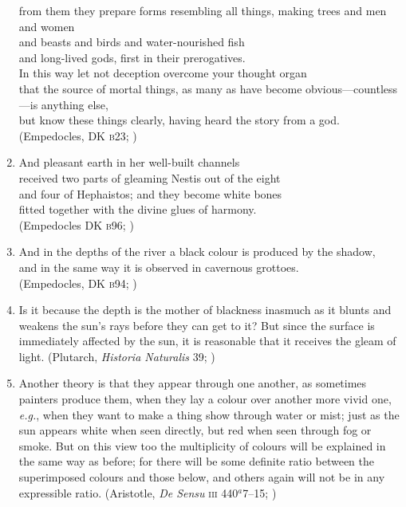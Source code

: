 \documentclass[10pt]{article}
\begin{document}
\begin{enumerate}
    from them they prepare forms resembling all things,
    making trees and men and women\\
    and beasts and birds and water-nourished fish\\
    and long-lived gods, first in their prerogatives.\\
    In this way let not deception overcome your thought organ\\
    that the source of mortal things, as many as have become obvious---countless---is anything else,\\
    but know these things clearly, having heard the story from a god.\\ 
    (Empedocles, DK \textsc{b}23; \citealt[27 231]{Inwood:2001ve})
    \item And pleasant earth in her well-built channels\\
    received two parts of gleaming Nestis out of the eight\\
    and four of Hephaistos; and they become white bones\\
    fitted together with the divine glues of harmony.\\
    (Empedocles DK \textsc{b}96; \citealt[62 245]{Inwood:2001ve})
    \item And in the depths of the river a black colour is produced by the shadow,\\
    and in the same way it is observed in cavernous grottoes.\\
    (Empedocles, DK \textsc{b}94; \citealt[105 261]{Inwood:2001ve})
    \item Is it because the depth is the mother of blackness inasmuch as it blunts and weakens the sun's rays before they can get to it? But since the surface is immediately affected by the sun, it is reasonable that it receives the gleam of light.  (Plutarch, \emph{Historia Naturalis} 39; \citealt[\textsc{CTXT}-87 137--138]{Inwood:2001ve})
    \item Another theory is that they appear through one another, as sometimes painters produce them, when they lay a colour over another more vivid one, \emph{e.g.}, when they want to make a thing show through water or mist; just as the sun appears white when seen directly, but red when seen through fog or smoke. But on this view too the multiplicity of colours will be explained in the same way as before; for there will be some definite ratio between the superimposed colours and those below, and others again will not be in any expressible ratio. (Aristotle, \emph{De Sensu} \textsc{iii} 440\( ^{a} \)7--15; \citealt[235]{Hett:1936fk})

\end{enumerate}
\end{document}
